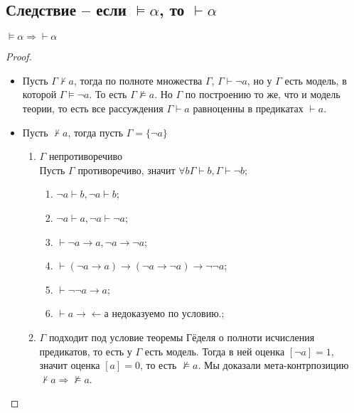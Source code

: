 \subsection{Следствие -- если \texorpdfstring{$\vDash \alpha$}{⊨ a}, то \texorpdfstring{$\vdash \alpha$}{⊢ a}}
\label{sec-8-7}
\begin{theorem}
$\vDash \alpha \Rightarrow \vdash \alpha$
\end{theorem}
\begin{proof}
\begin{itemize}
\item Пусть $\Gamma \nvdash a$, тогда по полноте множества $\Gamma$, $\Gamma \vdash \neg a$, но у $\Gamma$ есть модель, в которой $\Gamma \vDash \neg a$. То есть $\Gamma \nvDash a$. Но $\Gamma$ по построению то же, что и модель теории, то есть все рассуждения $\Gamma \vdash a$ равноценны в предикатах $\vdash a$.
\item Пусть $\nvdash a$, тогда пусть $\Gamma=\lbrace \neg a \rbrace$
\begin{enumerate}
\item $\Gamma$ непротиворечиво\\
Пусть $\Gamma$ противоречиво, значит $\forall b \Gamma \vdash b, \Gamma \vdash \neg b$;
\begin{enumerate}[label=(\alph*)]
\item $\neg a \vdash b, \neg a \vdash b$;
\item $\neg a \vdash a, \neg a \vdash \neg a$;
\item $\vdash \neg a \to a, \neg a \to \neg a$;
\item $\vdash (\neg a \to a) \to (\neg a \to \neg a) \to \neg \neg a$;
\item $\vdash \neg \neg a \to a$;
\item $\vdash a \to\leftarrow а$ недоказуемо по условию.;
\end{enumerate}
\item $\Gamma$ подходит под условие теоремы Гёделя о полноти исчисления предикатов, то есть у $\Gamma$ есть модель. Тогда в ней оценка $[\neg a] = 1$, значит оценка $[a] = 0$, то есть $\nvDash a$. Мы доказали мета-контрпозицию $\nvdash a \Rightarrow \nvDash a$.
\end{enumerate}
\end{itemize}
\end{proof}
